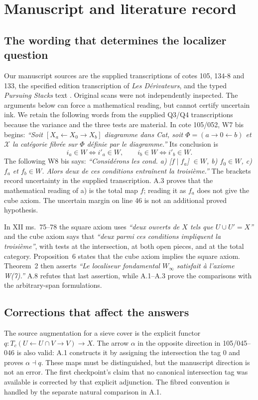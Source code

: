 \section{Manuscript and literature record}
\subsection{The wording that determines the localizer question}
Our manuscript sources are the supplied transcriptions of cotes 105, 134-8 and 133, the specified edition transcription of \emph{Les D\'erivateurs}, and the typed \emph{Pursuing Stacks} text \citep{GrothArchive105,GrothArchive134,GrothArchive133,GrothDerivateurs,GrothPursuingStacks}. Original scans were not independently inspected. The arguments below can force a mathematical reading, but cannot certify uncertain ink.
We retain the following words from the supplied Q3/Q4 transcriptions because the variance and the three tests are material. In cote 105/052, W7 bis begins: \emph{``Soit $[X_a\leftarrow X_0\to X_b]$ diagramme dans Cat, soit $\Phi=(a\to0\leftarrow b)$ et $\mathcal X$ la cat\'egorie fibr\'ee sur $\Phi$ d\'efinie par le diagramme.''} Its conclusion is
\[
 i_a\in W\Longleftrightarrow i'_a\in W,
 \qquad i_b\in W\Longleftrightarrow i'_b\in W.
\]
The following W8 bis says: \emph{``Consid\'erons les cond. a) [$f\mid f_a$] $\in W$, b) $f_0\in W$, c) $f_a$ et $f_b\in W$. Alors deux de ces conditions entra\^inent la troisi\`eme.''} The brackets record uncertainty in the supplied transcription. A.3 proves that the mathematical reading of a) is the total map $f$; reading it as $f_a$ does not give the cube axiom. The uncertain margin on line 46 is not an additional proved hypothesis.

In XII ms.~75--78 the square axiom uses \emph{``deux ouverts de $X$ tels que $U\cup U'=X$''} and the cube axiom says that \emph{``deux parmi ces conditions impliquent la troisi\`eme''}, with tests at the intersection, at both open pieces, and at the total category. Proposition~6 states that the cube axiom implies the square axiom. Theorem~2 then asserts \emph{``Le localiseur fondamental $W_\infty$ satisfait \`a l'axiome W(7).''} A.8 refutes that last assertion, while A.1--A.3 prove the comparisons with the arbitrary-span formulations.

\subsection{Corrections that affect the answers}
The source augmentation for a sieve cover is the explicit functor $q:T_c(U\leftarrow U\cap V\to V)\to X$. The arrow $\alpha$ in the opposite direction in 105/045--046 is also valid: A.1 constructs it by assigning the intersection the tag $0$ and proves $\alpha\dashv q$. These maps must be distinguished, but the manuscript direction is not an error. The first checkpoint's claim that no canonical intersection tag was available is corrected by that explicit adjunction. The fibred convention is handled by the separate natural comparison in A.1.

